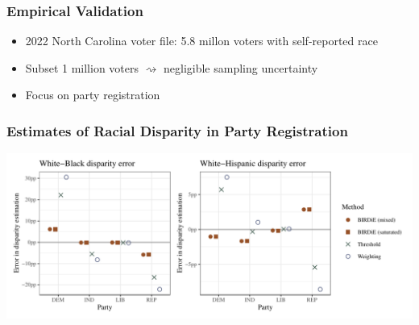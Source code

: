 \documentclass[handout]{beamer}
\begin{document}
\begin{frame}

  \frametitle{Empirical Validation}

  \begin{itemize}
  \item 2022 North Carolina voter file: 5.8 millon voters with
    self-reported race
  \item Subset 1 million voters $\rightsquigarrow$ negligible sampling
    uncertainty

    \vfill
  \item Focus on party registration

  \end{itemize}

\end{frame}

\begin{frame}

  \frametitle{Estimates of Racial Disparity in Party Registration}

  \includegraphics[width=\textwidth]{../paper/figures/nc_disp.pdf}


\end{frame}
\end{document}
